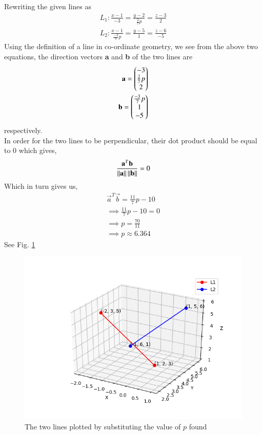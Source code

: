 Rewriting the given lines as 
\begin{align}
 L_1: \frac{x - 1}{-3}=\frac{y-2}{\frac{2}{7}p}=\frac{z-3}{2}
\\
 L_2: \frac{x - 1}{\frac{-3}{7}p}=\frac{y-5}{1}=\frac{z-6}{-5}
 \end{align}
 Using the definition of a line in co-ordinate geometry, we see from the above two equations, the direction vectors \textbf{a} and \textbf{b} of the two lines are
 \begin{align}
 \mathbf{a} = 
 \begin{pmatrix}-3\\
  \frac{2}{7}p\\
  2\end{pmatrix}
\\
  \mathbf{b} = 
 \begin{pmatrix}\frac{-3}{7}p\\
  1\\
  -5\end{pmatrix}
 \end{align}
 respectively.\\
 In order for the two lines to be perpendicular, their dot product should be equal to 0 which gives,
 \begin{equation}
 \frac{\mathbf{a}^T\mathbf{b}}{\left\lVert\textbf{a}\right\rVert\left\lVert\textbf{b}\right\rVert} = 0
 \end{equation}
 Which in turn gives us,
 \begin{align}
 \vec{a}^T\vec{b} = \frac{11}{7}p - 10
 \\
 \implies \frac{11}{7}p - 10 = 0
 \\  
 \implies p = \frac{70}{11} 
 \\
 \implies p \approx 6.364
 \end{align}
See Fig.   \ref{fig:solutions/line_plane/75/Figures}

 \begin{figure}[h]
 \centering
 \includegraphics[width=\columnwidth]{./solutions/line_plane/75/Figures/lines.png}
 \caption{The two lines plotted by substituting the value of $p$ found}
 \label{fig:solutions/line_plane/75/Figures}
 \end{figure}
